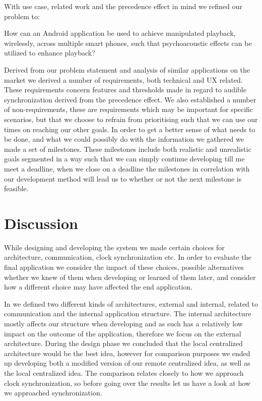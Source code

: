 With use case, related work and the precedence effect in mind we refined our problem to:
\begin{problemstatement}
    How can an Android application be used to achieve manipulated playback, wirelessly, across multiple smart phones, such that psychoacoustic effects can be utilized to enhance playback?
\end{problemstatement}

Derived from our problem statement and analysis of similar applications on the market we derived a number of requirements, both technical and \ac{UX} related.
These requirements concern features and thresholds made in regard to audible synchronization derived from the precedence effect.
We also established a number of non-requirements, these are requirements which may be important for specific scenarios, but that we choose to refrain from prioritising such that we can use our times on reaching our other goals.
In order to get a better sense of what needs to be done, and what we could possibly do with the information we gathered we made a set of milestones.
These milestones include both realistic and unrealistic goals segmented in a way such that we can simply continue developing till me meet a deadline, when we close on a deadline the milestones in correlation with our development method will lead us to whether or not the next milestone is feasible.



\section{Discussion}
While designing and developing the system we made certain choices for architecture, communication, clock synchronization etc.
In order to evaluate the final application we consider the impact of these choices, possible alternatives whether we knew of them when developing or learned of them later, and consider how a different choice may have affected the end application.

In  we defined two different kinds of architectures, external and internal, related to communication and the internal application structure.
The internal architecture mostly affects our structure when developing and as such has a relatively low impact on the outcome of the application, therefore we focus on the external architecture.
During the design phase we concluded that the local centralized architecture would be the best idea, however for comparison purposes we ended up developing both a modified version of our remote centralized idea, as well as the local centralized idea.
The comparison relates closely to how we approach clock synchronization, so before going over the results let us have a look at how we approached synchronization.

